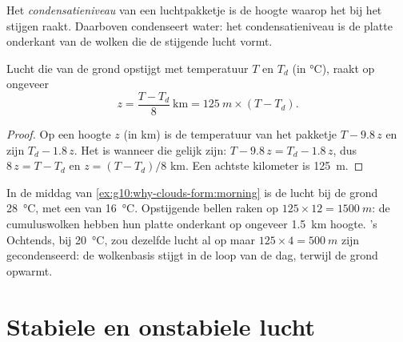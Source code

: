 \begin{definition}[Condensatieniveau]\label{def:g10:why-clouds-form:condensation-level}
Het \emph{condensatieniveau} van een luchtpakketje is
de hoogte waarop het bij het stijgen  raakt. Daarboven condenseert
water: het condensatieniveau is de platte onderkant van de wolken die de
stijgende lucht vormt.
\end{definition}

\begin{proposition}\label{prop:g10:why-clouds-form:lcl}
Lucht die van de grond opstijgt met temperatuur $T$ en  $T_d$
(in \unit{\degreeCelsius}), raakt  op ongeveer
\[
  z = \frac{T - T_d}{8}\ \text{km} = \qty{125}{m} \times (T - T_d).
\]
\end{proposition}

\begin{proof}
Op een hoogte $z$ (in km) is de temperatuur van het pakketje $T - 9.8\,z$ en zijn
 $T_d - 1.8\,z$. Het is  wanneer die gelijk zijn:
$T - 9.8\,z = T_d - 1.8\,z$, dus $8\,z = T - T_d$ en $z = (T - T_d)/8$ km.
Een achtste kilometer is \qty{125}{m}.
\end{proof}

\begin{example}\label{ex:g10:why-clouds-form:base}
In de middag van \cref{ex:g10:why-clouds-form:morning} is de lucht bij de grond
\qty{28}{\degreeCelsius}, met een  van \qty{16}{\degreeCelsius}.
Opstijgende bellen raken  op $125 \times 12 = \qty{1500}{m}$: de
cumuluswolken hebben hun platte onderkant op ongeveer \qty{1.5}{km} hoogte. 's
Ochtends, bij \qty{20}{\degreeCelsius}, zou dezelfde lucht al op maar
$125 \times 4 = \qty{500}{m}$ zijn gecondenseerd: de wolkenbasis stijgt in de
loop van de dag, terwijl de grond opwarmt.
\end{example}

\section{Stabiele en onstabiele lucht}

